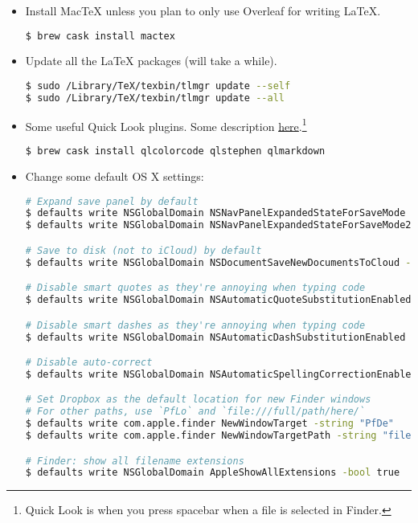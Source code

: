 \begin{itemize}
\item Install MacTeX unless you plan to only use Overleaf for writing LaTeX.
\begin{lstlisting}[language=bash]
$ brew cask install mactex
\end{lstlisting}

\item Update all the LaTeX packages (will take a while).
\begin{lstlisting}[language=bash]
$ sudo /Library/TeX/texbin/tlmgr update --self
$ sudo /Library/TeX/texbin/tlmgr update --all
\end{lstlisting}

\item Some useful Quick Look plugins.  Some description \href{https://github.com/sindresorhus/quick-look-plugins}{here}.\footnote{Quick Look is when you press spacebar when a file is selected in Finder.}
\begin{lstlisting}[language=bash]
$ brew cask install qlcolorcode qlstephen qlmarkdown
\end{lstlisting}

\item Change some default OS X settings:
\begin{lstlisting}[language=bash]
# Expand save panel by default
$ defaults write NSGlobalDomain NSNavPanelExpandedStateForSaveMode -bool true
$ defaults write NSGlobalDomain NSNavPanelExpandedStateForSaveMode2 -bool true

# Save to disk (not to iCloud) by default
$ defaults write NSGlobalDomain NSDocumentSaveNewDocumentsToCloud -bool false

# Disable smart quotes as they're annoying when typing code
$ defaults write NSGlobalDomain NSAutomaticQuoteSubstitutionEnabled -bool false

# Disable smart dashes as they're annoying when typing code
$ defaults write NSGlobalDomain NSAutomaticDashSubstitutionEnabled -bool false

# Disable auto-correct
$ defaults write NSGlobalDomain NSAutomaticSpellingCorrectionEnabled -bool false

# Set Dropbox as the default location for new Finder windows
# For other paths, use `PfLo` and `file:///full/path/here/`
$ defaults write com.apple.finder NewWindowTarget -string "PfDe"
$ defaults write com.apple.finder NewWindowTargetPath -string "file://${HOME}/Dropbox/"

# Finder: show all filename extensions
$ defaults write NSGlobalDomain AppleShowAllExtensions -bool true


\end{lstlisting}
\end{itemize}
